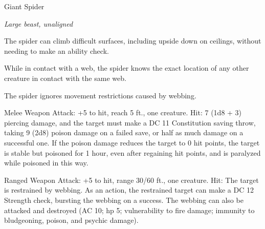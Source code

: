 \begin{monsterbox}{Giant Spider}
\begin{hangingpar}
\textit{Large beast, unaligned}
\end{hangingpar}
\dndline%
\basics[%
armorclass = 14,
hitpoints = 4d10 + 4,
speed = {30 ft., climb 30 ft.}
]
\dndline%
\stats[%
STR = \stat{14},
DEX = \stat{16},
CON = \stat{12},
INT = \stat{2},
WIS = \stat{11},
CHA = \stat{4}
]
\dndline%
\details[%
skills={Stealth +7, },
damageimmunities={},
savingthrows={},
conditionimmunities={},
damageresistances={},
damagevulnerabilities={},
senses={blindsight 10 ft., darkvision 60 ft., passive Perception 10},
challenge=1
]
\dndline%
\begin{monsteraction}
The spider can climb difficult surfaces, including upside down on ceilings, without needing to make an ability check.
\end{monsteraction}
\begin{monsteraction}
While in contact with a web, the spider knows the exact location of any other creature in contact with the same web.
\end{monsteraction}
\begin{monsteraction}
The spider ignores movement restrictions caused by webbing.
\end{monsteraction}
\begin{monsteraction}[Bite]
Melee Weapon Attack: +5 to hit, reach 5 ft., one creature. Hit: 7 (1d8 + 3) piercing damage, and the target must make a DC 11 Constitution saving throw, taking 9 (2d8) poison damage on a failed save, or half as much damage on a successful one. If the poison damage reduces the target to 0 hit points, the target is stable but poisoned for 1 hour, even after regaining hit points, and is paralyzed while poisoned in this way.
\end{monsteraction}
\begin{monsteraction}
Ranged Weapon Attack: +5 to hit, range 30/60 ft., one creature. Hit: The target is restrained by webbing. As an action, the restrained target can make a DC 12 Strength check, bursting the webbing on a success. The webbing can also be attacked and destroyed (AC 10; hp 5; vulnerability to fire damage; immunity to bludgeoning, poison, and psychic damage).
\end{monsteraction}
\end{monsterbox}